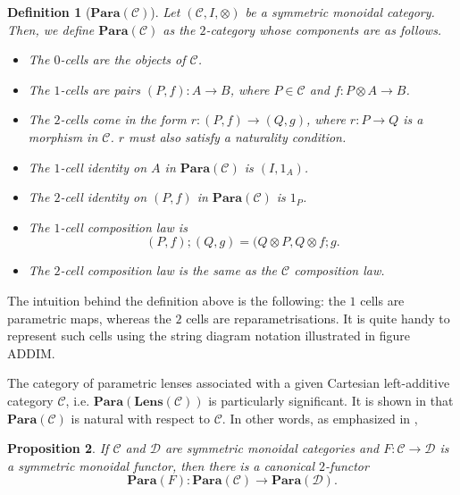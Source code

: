 \documentclass[11pt,a4paper,openright,twoside]{report}
\theoremstyle{plain}
\newtheorem{proposition}{Proposition}
\newtheorem{definition}[proposition]{Definition}
\theoremstyle{definition}
\begin{document}
\begin{definition}[$\mathbf{Para}(\mathcal{C})$]
  Let $(\mathcal{C},I,\otimes)$ be a symmetric monoidal category. Then, we define $\mathbf{Para}(\mathcal{C})$ as the $2$-category whose components are as follows.
  \begin{itemize}
    \item The $0$-cells are the objects of $\mathcal{C}$.
    \item The $1$-cells are pairs $(P,f): A \to B$, where $P \in \mathcal{C}$ and $f: P \otimes A \to B$.
    \item The $2$-cells come in the form $r: (P,f) \to (Q,g)$, where $r: P \to Q$ is a morphism in $\mathcal{C}$. $r$ must also satisfy a naturality condition.
    \item The $1$-cell identity on $A$ in $\mathbf{Para}(\mathcal{C})$ is $(I,1_A)$.
    \item The $2$-cell identity on $(P,f)$ in $\mathbf{Para}(\mathcal{C})$ is $1_P$.
    \item The $1$-cell composition law is
      \[(P,f) ; (Q,g) = (Q \otimes P, Q \otimes f ; g.\]
    \item The $2$-cell composition law is the same as the $\mathcal{C}$ composition law.
  \end{itemize}
    
\end{definition}

The intuition behind the definition above is the following: the $1$ cells are parametric maps, whereas the $2$ cells are reparametrisations.
It is quite handy to represent such cells using the string diagram notation illustrated in figure ADDIM.


The category of parametric lenses associated with a given Cartesian left-additive category $\mathcal{C}$, i.e. $\mathbf{Para}(\mathbf{Lens}(\mathcal{C}))$ is particularly significant. It is shown in \cite{cruttwellDeepLearningParametric} that $\mathbf{Para}(\mathcal{C})$ is natural with respect to $\mathcal{C}$. In other words, as emphasized in \cite{shieblerCategoryTheoryMachine2021},

\begin{proposition}\label{proposition: canembedding2}
  If $\mathcal{C}$ and $\mathcal{D}$ are symmetric monoidal categories and $F: \mathcal{C} \to \mathcal{D}$ is a symmetric monoidal functor, then  there is a canonical $2$-functor 
  \[\mathbf{Para}(F): \mathbf{Para}(\mathcal{C}) \to \mathbf{Para}(\mathcal{D}).\]
\end{proposition}
\end{document}
